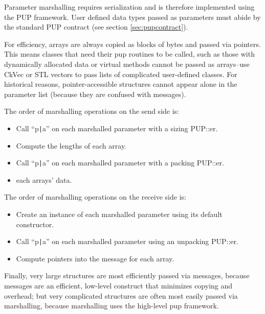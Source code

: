 Parameter marshalling requires serialization and is therefore
implemented using the PUP framework.  User defined data types passed
as parameters must abide by the standard PUP contract (see section
\ref{sec:pupcontract}).

For efficiency, arrays are always copied as blocks of bytes and passed
via pointers.  This means classes that need their pup routines to be
called, such as those with dynamically allocated data or virtual
methods cannot be passed as arrays--use CkVec or STL vectors to pass
lists of complicated user-defined classes.  For historical reasons,
pointer-accessible structures cannot appear alone in the parameter
list (because they are confused with messages).

The order of marshalling operations on the send side is:
\begin{itemize}
\item Call ``p\verb.|.a'' on each marshalled parameter with a sizing PUP::er.
\item Compute the lengths of each array.
\item Call ``p\verb.|.a'' on each marshalled parameter with a packing PUP::er.
\item {} each arrays' data.
\end{itemize}

The order of marshalling operations on the receive side is:
\begin{itemize}
\item Create an instance of each marshalled parameter using its default constructor.
\item Call ``p\verb.|.a'' on each marshalled parameter using an unpacking PUP::er.
\item Compute pointers into the message for each array.
\end{itemize}

Finally, very large structures are most efficiently passed via messages,
because messages are an efficient, low-level construct that minimizes copying
and overhead; but very complicated structures are often most easily passed via 
marshalling, because marshalling uses the high-level pup framework.


